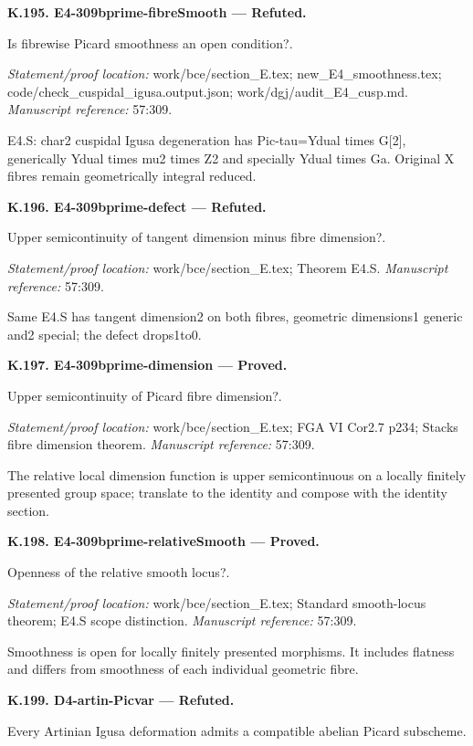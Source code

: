 \par\medskip\noindent\textbf{K.195. E4-309bprime-fibreSmooth --- Refuted.}\par
Is fibrewise Picard smoothness an open condition?.
\par\emph{Statement/proof location:} work/bce/section\_E.tex; new\_E4\_smoothness.tex; code/check\_cuspidal\_igusa.output.json; work/dgj/audit\_E4\_cusp.md.
\emph{Manuscript reference:} 57:309.
\par E4.S: char2 cuspidal Igusa degeneration has Pic-tau=Ydual times G[2], generically Ydual times mu2 times Z2 and specially Ydual times Ga. Original X fibres remain geometrically integral reduced.
\par\medskip\noindent\textbf{K.196. E4-309bprime-defect --- Refuted.}\par
Upper semicontinuity of tangent dimension minus fibre dimension?.
\par\emph{Statement/proof location:} work/bce/section\_E.tex; Theorem E4.S.
\emph{Manuscript reference:} 57:309.
\par Same E4.S has tangent dimension2 on both fibres, geometric dimensions1 generic and2 special; the defect drops1to0.
\par\medskip\noindent\textbf{K.197. E4-309bprime-dimension --- Proved.}\par
Upper semicontinuity of Picard fibre dimension?.
\par\emph{Statement/proof location:} work/bce/section\_E.tex; FGA VI Cor2.7 p234; Stacks fibre dimension theorem.
\emph{Manuscript reference:} 57:309.
\par The relative local dimension function is upper semicontinuous on a locally finitely presented group space; translate to the identity and compose with the identity section.
\par\medskip\noindent\textbf{K.198. E4-309bprime-relativeSmooth --- Proved.}\par
Openness of the relative smooth locus?.
\par\emph{Statement/proof location:} work/bce/section\_E.tex; Standard smooth-locus theorem; E4.S scope distinction.
\emph{Manuscript reference:} 57:309.
\par Smoothness is open for locally finitely presented morphisms. It includes flatness and differs from smoothness of each individual geometric fibre.
\par\medskip\noindent\textbf{K.199. D4-artin-Picvar --- Refuted.}\par
Every Artinian Igusa deformation admits a compatible abelian Picard subscheme.
